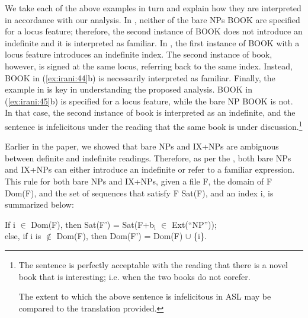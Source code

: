 \documentclass[output=paper,
modfonts
]{langscibook}
\begin{document}
We take each of the above examples in turn and explain how they are interpreted in accordance with our analysis. In , neither of the bare NPs BOOK are specified for a locus feature; therefore, the second instance of BOOK does not introduce an indefinite and it is interpreted as familiar. In , the first instance of BOOK with a locus feature introduces an indefinite index. The second instance of book, however, is signed at the same locus, referring back to the same index. Instead, BOOK in (\ref{ex:irani:44}b) is necessarily interpreted as familiar. Finally, the example in  is key in understanding the proposed analysis. BOOK in (\ref{ex:irani:45}b) is specified for a locus feature, while the bare NP BOOK is not. In that case, the second instance of book is interpreted as an indefinite, and the sentence is infelicitous under the reading that the same book is under discussion.\footnote{The sentence is perfectly acceptable with the reading that there is a novel book that is interesting; i.e. when the two books do not corefer.  
	
	\begin{exe} 
	\end{exe} 

The extent to which the above sentence is infelicitous in ASL may be compared to the  translation provided.} 

Earlier in the paper, we showed that bare NPs and IX+NPs are ambiguous between definite and indefinite readings. Therefore, as per the , both bare NPs and IX+NPs can either introduce an indefinite or refer to a familiar expression. This rule for both bare NPs and IX+NPs, given a file F, the domain of F Dom(F), and the set of sequences that satisfy F Sat(F), and an index i, is summarized below: 

\begin{exe}
\ex \label{ex:irani:46} If i \(\in\) Dom(F), then Sat(F') = Sat(F+b$_\text{i}$ \(\in\) Ext(``NP''));\\ else, if i is \(\notin\) Dom(F), then Dom(F') = Dom(F) \(\cup\) \{i\}. \par  
\end{exe}
\end{document}
